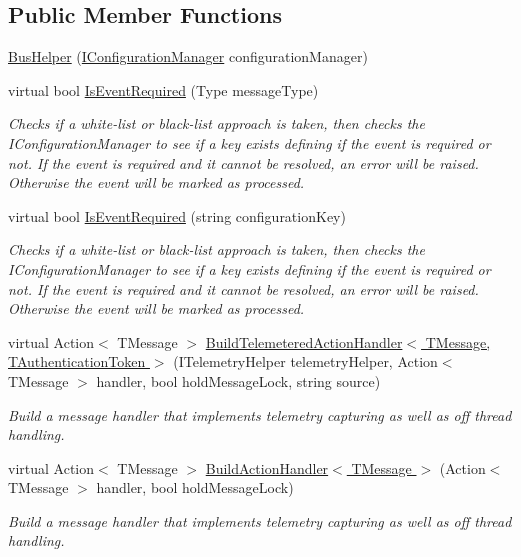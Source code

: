 \subsection*{Public Member Functions}
\begin{DoxyCompactItemize}
\item 
\hyperlink{classCqrs_1_1Bus_1_1BusHelper_a7799db8bc78bdd9ec25be5bd301d0b8a_a7799db8bc78bdd9ec25be5bd301d0b8a}{Bus\+Helper} (\hyperlink{interfaceCqrs_1_1Configuration_1_1IConfigurationManager}{I\+Configuration\+Manager} configuration\+Manager)
\item 
virtual bool \hyperlink{classCqrs_1_1Bus_1_1BusHelper_a28c675e976adbf348637ec6ff6410c1a_a28c675e976adbf348637ec6ff6410c1a}{Is\+Event\+Required} (Type message\+Type)
\begin{DoxyCompactList}\small\item\em Checks if a white-\/list or black-\/list approach is taken, then checks the I\+Configuration\+Manager to see if a key exists defining if the event is required or not. If the event is required and it cannot be resolved, an error will be raised. Otherwise the event will be marked as processed. \end{DoxyCompactList}\item 
virtual bool \hyperlink{classCqrs_1_1Bus_1_1BusHelper_a60a9603d5c6b7f29ee42491475714895_a60a9603d5c6b7f29ee42491475714895}{Is\+Event\+Required} (string configuration\+Key)
\begin{DoxyCompactList}\small\item\em Checks if a white-\/list or black-\/list approach is taken, then checks the I\+Configuration\+Manager to see if a key exists defining if the event is required or not. If the event is required and it cannot be resolved, an error will be raised. Otherwise the event will be marked as processed. \end{DoxyCompactList}\item 
virtual Action$<$ T\+Message $>$ \hyperlink{classCqrs_1_1Bus_1_1BusHelper_a7edd5b2ac0d46ce225e592f857f6d525_a7edd5b2ac0d46ce225e592f857f6d525}{Build\+Telemetered\+Action\+Handler$<$ T\+Message, T\+Authentication\+Token $>$} (I\+Telemetry\+Helper telemetry\+Helper, Action$<$ T\+Message $>$ handler, bool hold\+Message\+Lock, string source)
\begin{DoxyCompactList}\small\item\em Build a message handler that implements telemetry capturing as well as off thread handling. \end{DoxyCompactList}\item 
virtual Action$<$ T\+Message $>$ \hyperlink{classCqrs_1_1Bus_1_1BusHelper_a6dc1f5166b7bcd13aa7a0d5e25ded295_a6dc1f5166b7bcd13aa7a0d5e25ded295}{Build\+Action\+Handler$<$ T\+Message $>$} (Action$<$ T\+Message $>$ handler, bool hold\+Message\+Lock)
\begin{DoxyCompactList}\small\item\em Build a message handler that implements telemetry capturing as well as off thread handling. \end{DoxyCompactList}\end{DoxyCompactItemize}
